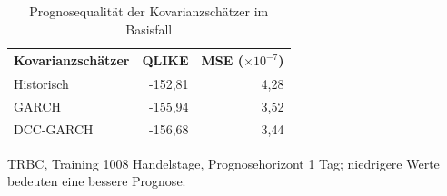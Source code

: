 \begin{table}[htbp]
  \centering
  \footnotesize
  \begin{tabular}{lrr}
    \toprule
    Kovarianzschätzer & QLIKE & MSE ($\times 10^{-7}$) \\
    \midrule
    Historisch & -152,81 & 4,28 \\
    GARCH & -155,94 & 3,52 \\
    DCC-GARCH & -156,68 & 3,44 \\
    \bottomrule
  \end{tabular}
  \caption{Prognosequalität der Kovarianzschätzer im Basisfall}
  \label{tab:statistik_basis}
  \begin{minipage}{\linewidth}\vspace{0.4em}\centering\footnotesize
  TRBC, Training 1008 Handelstage, Prognosehorizont 1 Tag; niedrigere Werte bedeuten eine bessere Prognose.
  \end{minipage}
\end{table}
